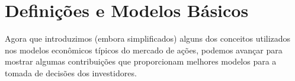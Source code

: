 \section{Definições e Modelos Básicos}
Agora que introduzimos (embora simplificados) alguns dos conceitos utilizados nos modelos econômicos típicos do mercado de ações, podemos avançar para mostrar algumas contribuições que proporcionam melhores modelos para a tomada de decisões dos investidores.



